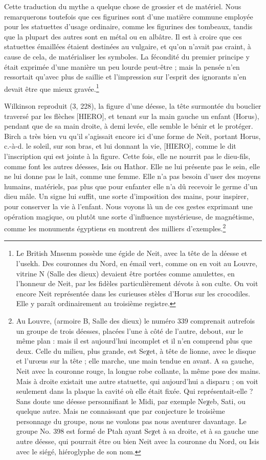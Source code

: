 \documentclass[a4paper, 11pt, oneside]{article}
\begin{document}
Cette traduction du mythe a quelque chose de grossier et de matériel. Nous remarquerons toutefois que ces figurines sont d'une matière commune employée pour les statuettes d'usage ordinaire, comme les figurines des tombeaux, tandis que la plupart des autres sont en métal ou en albâtre. Il est à croire que ces statuettes émaillées étaient destinées au vulgaire, et qu'on n'avait pas craint, à cause de cela, de matérialiser les symboles. La fécondité du premier principe y était exprimée d'une manière un peu lourde peut-être ; mais la pensée n'en ressortait qu'avec plus de saillie et l'impression sur l'esprit des ignorants n'en devait être que mieux gravée.\footnote{Le British Mnsenm possède une égide de Neit, avec la tête de la déesse et l'usekh.  Des couronnes du Nord, en émail vert, comme on en voit au Louvre, vitrine N (Salle des dieux) devaient être portées comme amulettes, en l'honneur de Neit, par les fidèles particulièrement dévots à son culte.  On voit encore Neit représentée dans les curieuses stèles d'Horus sur les crocodiles. Elle y paraît ordinairement au troisième registre.}

Wilkinson reproduit (3, 228), la figure d'une déesse, la tête surmontée du bouclier traversé par les flèches [HIERO], et tenant sur la main gauche un enfant (Horus), pendant que de sa main droite, à demi levée, elle semble le bénir et le protéger. Birch a très bien vu qu'il s'agissait encore ici d'une forme de Neit, portant Horus, c.-à-d. le soleil, sur son bras, et lui donnant la vie, [HIERO], comme le dit l'inscription qui est jointe à la figure. Cette fois, elle ne nourrit pas le dieu-fils, comme font les autres déesses, Isis ou Hathor. Elle ne lui présente pas le sein, elle ne lui donne pas le lait, comme une femme. Elle n'a pas besoin d'user des moyens humains, matériels, pas plus que pour enfanter elle n'a dû recevoir le germe d'un dieu mâle. Un signe lui suffit, une sorte d'imposition des mains, pour inspirer, pour conserver la vie à l'enfant. Nous voyons là un de ces gestes exprimant une opération magique, ou plutôt une sorte d'influence mystérieuse, de magnétisme, comme les monuments égyptiens en montrent des milliers d'exemples.\footnote{Au Louvre, (armoire B, Salle des dieux) le numéro 339 comprenait autrefois un groupe de trois déesses, placées l'une à côté de l'autre, debout, sur le même plan : mais il est aujourd'hui incomplet et il n'en comprend plus que deux. Celle du milieu, plus grande, est Seχet, à tête de lionne, avec le disque et l'urœus sur la tête ; elle marche, une main tendue en avant. A sa gauche, Neit avec la couronne rouge, la longue robe collante, la même pose des mains. Mais à droite existait une autre statuette, qui aujourd'hui a disparu ; on voit seulement dans la plaque la cavité où elle était fixée. Qui représentait-elle ? Sans doute une déesse personnifiant le Midi, par exemple Neχeb, Sati, ou quelque autre. Mais ne connaissant que par conjecture le troisième personnage du groupe, nous ne voulons pas nous aventurer davantage.  Le groupe No. 398 est formé de Ptah ayant Seχet à sa droite, et à sa gauche une autre déesse, qui pourrait être ou bien Neit avec la couronne du Nord, ou Isis avec le siégé, hiéroglyphe de son nom.}
\clearpage
\end{document}

